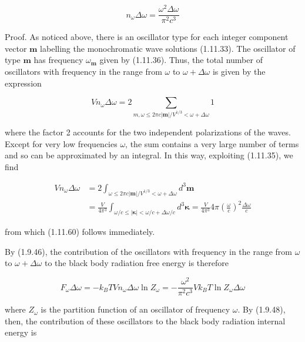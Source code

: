 \documentclass{article}
\begin{document}
\begin{equation*}
n_{\omega} \Delta \omega=\frac{\omega^{2} \Delta \omega}{\pi^{2} c^{3}} \tag{1.11.60}
\end{equation*}
 

Proof. As noticed above, there is an oscillator type for each integer component vector $\boldsymbol{m}$ labelling the monochromatic wave solutions (1.11.33). The oscillator of type $\boldsymbol{m}$ has frequency $\omega_{\boldsymbol{m}}$ given by (1.11.36). Thus, the total number of oscillators with frequency in the range from $\omega$ to $\omega+\Delta \omega$ is given by the expression
 
\begin{equation*}
V n_{\omega} \Delta \omega=2 \sum_{m, \omega \leq 2 \pi c|\boldsymbol{m}| / V^{1 / 3}<\omega+\Delta \omega} 1 \tag{1.11.61}
\end{equation*}
 
where the factor 2 accounts for the two independent polarizations of the waves. Except for very low frequencies $\omega$, the sum contains a very large number of terms and so can be approximated by an integral. In this way, exploiting (1.11.35), we find
 
\begin{align*}
V n_{\omega} \Delta \omega & =2 \int_{\omega \leq 2 \pi c|\boldsymbol{m}| / V^{1 / 3}<\omega+\Delta \omega} d^{3} \boldsymbol{m}  \tag{1.11.62}\\
& =\frac{V}{4 \pi^{3}} \int_{\omega / c \leq|\boldsymbol{\kappa}|<\omega / c+\Delta \omega / c} d^{3} \boldsymbol{\kappa}=\frac{V}{4 \pi^{3}} 4 \pi\left(\frac{\omega}{c}\right)^{2} \frac{\Delta \omega}{c}
\end{align*}
 
from which (1.11.60) follows immediately.

By (1.9.46), the contribution of the oscillators with frequency in the range
from $\omega$ to $\omega+\Delta \omega$ to the black body radiation free energy is therefore
 
\begin{equation*}
F_{\omega} \Delta \omega=-k_{B} T V n_{\omega} \Delta \omega \ln Z_{\omega}=-\frac{\omega^{2}}{\pi^{2} c^{3}} V k_{B} T \ln Z_{\omega} \Delta \omega \tag{1.11.63}
\end{equation*}
 
where $Z_{\omega}$ is the partition function of an oscillator of frequency $\omega$. By (1.9.48), then, the contribution of these oscillators to the black body radiation internal energy is
 
\end{document}
